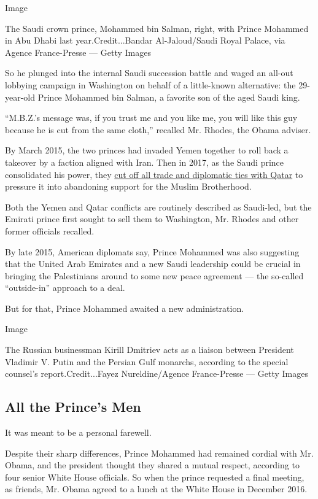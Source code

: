Image

The Saudi crown prince, Mohammed bin Salman, right, with Prince Mohammed
in Abu Dhabi last year.Credit...Bandar Al-Jaloud/Saudi Royal Palace, via
Agence France-Presse --- Getty Images

So he plunged into the internal Saudi succession battle and waged an
all-out lobbying campaign in Washington on behalf of a little-known
alternative: the 29-year-old Prince Mohammed bin Salman, a favorite son
of the aged Saudi king.

``M.B.Z.'s message was, if you trust me and you like me, you will like
this guy because he is cut from the same cloth,'' recalled Mr. Rhodes,
the Obama adviser.

By March 2015, the two princes had invaded Yemen together to roll back a
takeover by a faction aligned with Iran. Then in 2017, as the Saudi
prince consolidated his power, they
\href{https://www.nytimes.com/2018/01/22/world/middleeast/qatar-saudi-emir-boycott.html}{cut
off all trade and diplomatic ties with Qatar} to pressure it into
abandoning support for the Muslim Brotherhood.

Both the Yemen and Qatar conflicts are routinely described as Saudi-led,
but the Emirati prince first sought to sell them to Washington, Mr.
Rhodes and other former officials recalled.

By late 2015, American diplomats say, Prince Mohammed was also
suggesting that the United Arab Emirates and a new Saudi leadership
could be crucial in bringing the Palestinians around to some new peace
agreement --- the so-called ``outside-in'' approach to a deal.

But for that, Prince Mohammed awaited a new administration.

Image

The Russian businessman Kirill Dmitriev acts as a liaison between
President Vladimir V. Putin and the Persian Gulf monarchs, according to
the special counsel's report.Credit...Fayez Nureldine/Agence
France-Presse --- Getty Images

\hypertarget{all-the-princes-men}{%
\subsection{All the Prince's Men}\label{all-the-princes-men}}

It was meant to be a personal farewell.

Despite their sharp differences, Prince Mohammed had remained cordial
with Mr. Obama, and the president thought they shared a mutual respect,
according to four senior White House officials. So when the prince
requested a final meeting, as friends, Mr. Obama agreed to a lunch at
the White House in December 2016.

